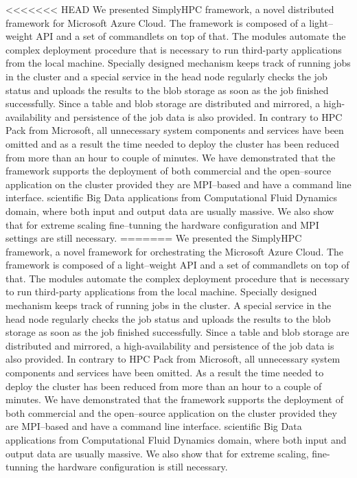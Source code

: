 \documentclass[3p,times]{elsarticle}
\begin{document}
<<<<<<< HEAD
We presented SimplyHPC framework, a novel distributed framework for Microsoft Azure Cloud. The framework is composed of a light--weight API and a set of commandlets on top of that. The modules automate the complex deployment procedure that is necessary to run third-party applications from the local machine. Specially designed mechanism keeps track of running jobs in the cluster and a special service in the head node regularly checks the job status and uploads the results to the blob storage as soon as the job finished successfully. Since a table and blob storage are distributed and mirrored, a high-availability and persistence of the job data is also provided. In contrary to HPC Pack from Microsoft, all unnecessary system components and services have been omitted and as a result the time needed to deploy the cluster has been reduced from more than an hour to couple of minutes.  We have demonstrated that the framework supports the deployment of both commercial and the open--source application on the cluster provided they are MPI--based and have a command line interface. scientific Big Data applications from Computational Fluid Dynamics domain, where both input and output data are usually massive. We also show that for extreme scaling fine--tunning the hardware configuration and MPI settings are still necessary.
=======
We presented the SimplyHPC framework, a novel framework for orchestrating the Microsoft Azure Cloud. The framework is composed of a light--weight API and a set of commandlets on top of that. The modules automate the complex deployment procedure that is necessary to run third-party applications from the local machine. Specially designed mechanism keeps track of running jobs in the cluster. A special service in the head node regularly checks the job status and uploads the results to the blob storage as soon as the job finished successfully. Since a table and blob storage are distributed and mirrored, a high-availability and persistence of the job data is also provided. In contrary to HPC Pack from Microsoft, all unnecessary system components and services have been omitted. As a result the time needed to deploy the cluster has been reduced from more than an hour to a couple of minutes.  We have demonstrated that the framework supports the deployment of both commercial and the open--source application on the cluster provided they are MPI--based and have a command line interface. scientific Big Data applications from Computational Fluid Dynamics domain, where both input and output data are usually massive. We also show that for extreme scaling, fine-tunning the hardware configuration is still necessary.
\end{document}

